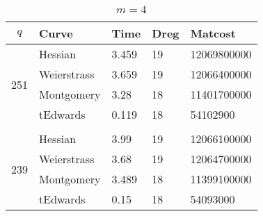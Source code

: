 \begin{table}[!h]
\centering
\caption{$m=4$}
\label{tb:m=4}
\begin{tabular}{lllll}
\hline
\multicolumn{1}{|c|}{$q$}                  & \multicolumn{1}{l|}{Curve}       & \multicolumn{1}{l|}{Time}  & \multicolumn{1}{l|}{Dreg} & \multicolumn{1}{l|}{Matcost}     \\ \hline
\multicolumn{1}{|l|}{\multirow{4}{*}{251}} & \multicolumn{1}{l|}{Hessian}     & \multicolumn{1}{l|}{3.459} & \multicolumn{1}{l|}{19}   & \multicolumn{1}{l|}{12069800000} \\ \cline{2-5} 
\multicolumn{1}{|l|}{}                     & \multicolumn{1}{l|}{Weierstrass} & \multicolumn{1}{l|}{3.659} & \multicolumn{1}{l|}{19}   & \multicolumn{1}{l|}{12066400000} \\ \cline{2-5} 
\multicolumn{1}{|l|}{}                     & \multicolumn{1}{l|}{Montgomery}  & \multicolumn{1}{l|}{3.28}  & \multicolumn{1}{l|}{18}   & \multicolumn{1}{l|}{11401700000} \\ \cline{2-5} 
\multicolumn{1}{|l|}{}                     & \multicolumn{1}{l|}{tEdwards}    & \multicolumn{1}{l|}{0.119} & \multicolumn{1}{l|}{18}   & \multicolumn{1}{l|}{54102900}    \\ \hline \vspace{-3mm}
                                           &                                  &                            &                           &                                  \\ \hline
\multicolumn{1}{|l|}{\multirow{4}{*}{239}} & \multicolumn{1}{l|}{Hessian}     & \multicolumn{1}{l|}{3.99}  & \multicolumn{1}{l|}{19}   & \multicolumn{1}{l|}{12066100000} \\ \cline{2-5} 
\multicolumn{1}{|l|}{}                     & \multicolumn{1}{l|}{Weierstrass} & \multicolumn{1}{l|}{3.68}  & \multicolumn{1}{l|}{19}   & \multicolumn{1}{l|}{12064700000} \\ \cline{2-5} 
\multicolumn{1}{|l|}{}                     & \multicolumn{1}{l|}{Montgomery}  & \multicolumn{1}{l|}{3.489} & \multicolumn{1}{l|}{18}   & \multicolumn{1}{l|}{11399100000} \\ \cline{2-5} 
\multicolumn{1}{|l|}{}                     & \multicolumn{1}{l|}{tEdwards}    & \multicolumn{1}{l|}{0.15}  & \multicolumn{1}{l|}{18}   & \multicolumn{1}{l|}{54093000}    \\ \hline
\end{tabular}
\end{table}